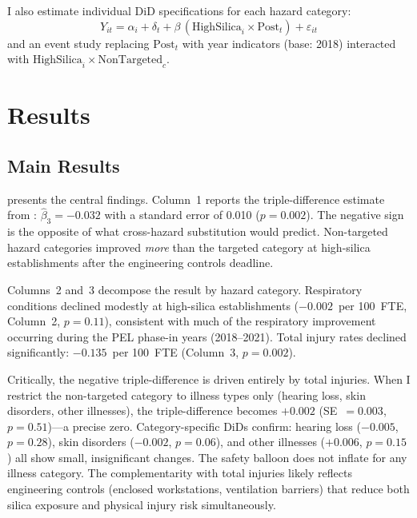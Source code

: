 \documentclass[12pt]{article}
\begin{document}
I also estimate individual DiD specifications for each hazard category:
\begin{equation}
Y_{it} = \alpha_i + \delta_t + \beta \, (\text{HighSilica}_i \times \text{Post}_t) + \varepsilon_{it}
\end{equation}
and an event study replacing $\text{Post}_t$ with year indicators (base: 2018) interacted with $\text{HighSilica}_i \times \text{NonTargeted}_c$.


\section{Results}
\label{sec:results}

\subsection{Main Results}



 presents the central findings. Column~1 reports the triple-difference estimate from : $\hat{\beta}_3 = -0.032$ with a standard error of 0.010 ($p = 0.002$). The negative sign is the opposite of what cross-hazard substitution would predict. Non-targeted hazard categories improved \textit{more} than the targeted category at high-silica establishments after the engineering controls deadline.

Columns~2 and~3 decompose the result by hazard category. Respiratory conditions declined modestly at high-silica establishments ($-0.002$~per 100~FTE, Column~2, $p = 0.11$), consistent with much of the respiratory improvement occurring during the PEL phase-in years (2018--2021). Total injury rates declined significantly: $-0.135$~per 100~FTE (Column~3, $p = 0.002$).

Critically, the negative triple-difference is driven entirely by total injuries. When I restrict the non-targeted category to illness types only (hearing loss, skin disorders, other illnesses), the triple-difference becomes $+0.002$ (SE~$= 0.003$, $p = 0.51$)---a precise zero. Category-specific DiDs confirm: hearing loss ($-0.005$, $p = 0.28$), skin disorders ($-0.002$, $p = 0.06$), and other illnesses ($+0.006$, $p = 0.15$) all show small, insignificant changes. The safety balloon does not inflate for any illness category. The complementarity with total injuries likely reflects engineering controls (enclosed workstations, ventilation barriers) that reduce both silica exposure and physical injury risk simultaneously.
\end{document}
